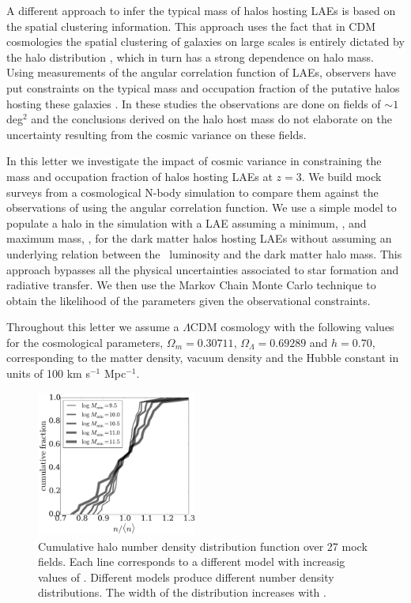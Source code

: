 \documentclass{emulateapj}
\newcommand{\ly}{{\ifmmode{{\rm Ly}\alpha}\else{Ly$\alpha$}\fi}}
\newcommand{\mmin}{{\ifmmode{{M_{\rm min}}}\else{${M_{\rm min}}$}\fi}}
\newcommand{\mmax}{{\ifmmode{{M_{\rm max}}}\else{${M_{\rm max}}$}\fi}}
\begin{document}
A different approach to infer the typical mass of halos hosting
LAEs is based on the spatial clustering information. 
This approach uses the fact
that in CDM cosmologies the spatial clustering of galaxies on large
scales is entirely dictated by the halo distribution
\citep{Colberg00}, which in turn has a strong dependence on halo
mass. 
Using measurements of the angular correlation function of LAEs,
observers have put constraints on the typical mass and occupation
fraction of the putative halos hosting these galaxies
\citep{Hayashino2004,Gawiser07,Nilsson2007,Ouchi2010,Bielby16}. 
In these studies the observations are done on fields of $\sim 1$ deg$^{2}$ and
the conclusions derived on the halo host mass do not elaborate on the
uncertainty resulting from the cosmic variance on these fields. 

In this letter we investigate the impact of cosmic variance in
constraining the mass and occupation fraction of halos hosting LAEs at $z=3$.
We build mock surveys from a cosmological N-body simulation to compare them
against the observations of \cite{Bielby16} using the angular
correlation function.  
We use a simple model to populate a halo in the simulation with a LAE   
assuming a minimum, \mmin, and maximum mass, \mmax, for the dark
matter halos hosting LAEs  without assuming  an underlying relation 
between the \ly\  luminosity and the dark matter halo mass.  
This approach bypasses all the physical uncertainties associated to
star formation and radiative transfer. 
We then use the Markov Chain Monte Carlo technique to obtain the
likelihood of the parameters given the observational constraints. 

Throughout this letter we assume a $\Lambda$CDM cosmology with the
following values for the cosmological parameters, $\Omega_{m}=0.30711$,
$\Omega_{\Lambda}=0.69289$ and $h=0.70$, corresponding to the matter
density, vacuum density and the Hubble constant in units of 100 km
s$^{-1}$ Mpc$^{-1}$. 


\begin{figure}
\includegraphics[width=0.47\textwidth]{fig1.pdf}
\caption{Cumulative halo number density distribution function over
  27 mock fields. Each line corresponds to a
  different model with increasig values of \mmin. 
  Different models produce different number density distributions. 
  The width of the distribution increases with \mmin. } 
\label{fig:cosmicv0}
\end{figure}
\end{document}
